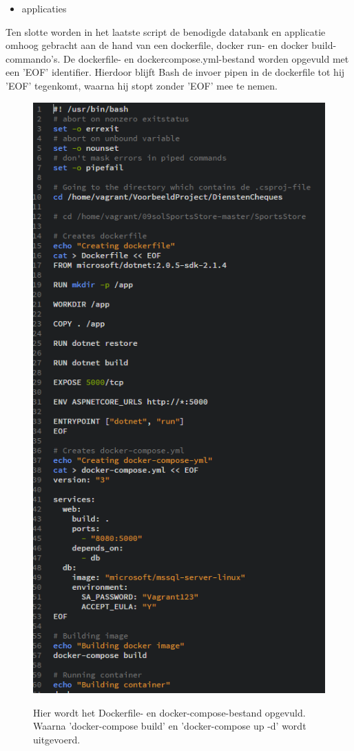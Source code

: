 \begin{itemize}[noitemsep]
	\item applicaties
\end{itemize}

Ten slotte worden in het laatste script de benodigde databank en applicatie omhoog gebracht aan de hand van een dockerfile, docker run- en docker build-commando's.
De dockerfile- en dockercompose.yml-bestand worden opgevuld met een 'EOF' identifier. Hierdoor blijft Bash de invoer pipen in de dockerfile tot hij 'EOF' tegenkomt, waarna hij stopt zonder 'EOF' mee te nemen.

\begin{figure}
	\centering
	\caption{Hier wordt het Dockerfile- en docker-compose-bestand opgevuld. Waarna 'docker-compose build' en 'docker-compose up -d' wordt uitgevoerd.}
	\includegraphics[scale=0.6]{img/centosapplicaties01}
	\label{centosapplicatie}
\end{figure}
